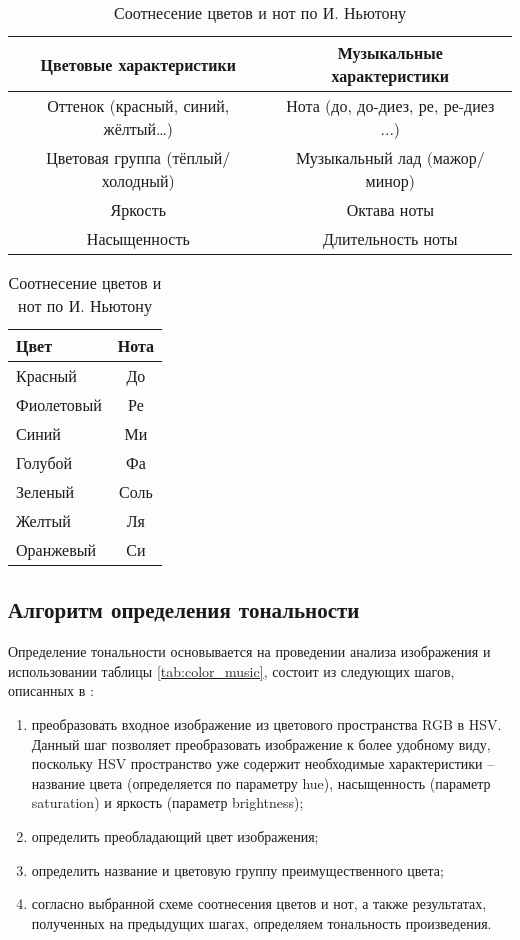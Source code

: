 	\begin{table}[ht]
		\centering
		\caption{Соотношение цветовых и музыкальных характеристик}
		\label{tab:color_music}
		\small 
		\begin{tabular}{|c|c|}
			\hline
			\textbf{Цветовые характеристики} & \textbf{Музыкальные характеристики} \\
			\hline
			Оттенок (красный, синий, жёлтый…) & Нота (до, до-диез, ре, ре-диез ...) \\
			\hline
			Цветовая группа (тёплый/холодный) & Музыкальный лад (мажор/минор) \\
			\hline
			Яркость & Октава ноты \\
			\hline
			Насыщенность & Длительность ноты \\
			\hline
		\end{tabular}
		
		\vspace{1em} %
		
		\caption{Соотнесение цветов и нот по И. Ньютону}
		\label{tab:Newton}	
		\begin{tabular}{lc}
			\toprule
			\textbf{Цвет} & \textbf{Нота} \\
			\midrule
			Красный & До \\
			Фиолетовый & Ре \\
			Синий & Ми \\
			Голубой & Фа \\
			Зеленый & Соль \\
			Желтый & Ля \\
			Оранжевый & Си \\
			\bottomrule
		\end{tabular}
	\end{table}

	\subsection {Алгоритм определения тональности}	
		Определение тональности основывается на проведении анализа изображения и использовании таблицы \ref{tab:color_music}, состоит из следующих шагов, описанных в \cite{web}: 
		\begin{enumerate}
			\item преобразовать входное изображение из цветового пространства
			RGB в HSV. Данный шаг позволяет преобразовать изображение к более
			удобному виду, поскольку HSV пространство уже содержит необходимые
			характеристики – название цвета (определяется по параметру hue),
			насыщенность (параметр saturation) и яркость (параметр brightness);
			\item определить преобладающий цвет изображения;
			\item определить название и цветовую группу преимущественного цвета;
			\item согласно выбранной схеме соотнесения цветов и нот, а также результатах, полученных на предыдущих шагах, определяем тональность произведения.
		\end{enumerate}